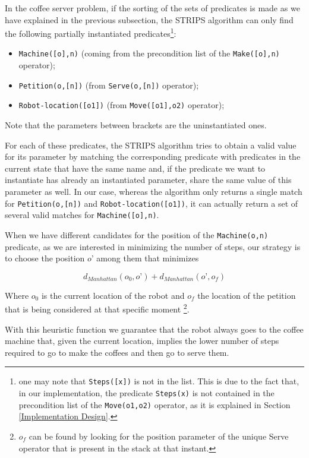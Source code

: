 \documentclass[12pt,a4paper,oneside]{article}
\numberwithin{equation}{section}
\numberwithin{equation}{section}
\theoremstyle{definition}
\begin{document}
In the coffee server problem, if the sorting of the sets of predicates is made as we have explained in the previous subsection, the STRIPS algorithm can only find the following partially instantiated predicates\footnote{one may note that \texttt{Steps([x])} is not in the list. This is due to the fact that, in our implementation, the predicate \texttt{Steps(x)} is not contained in the precondition list of the \texttt{Move(o1,o2)} operator, as it is explained in Section \ref{Implementation Design}.}:
\begin{itemize}
	\item \texttt{Machine([o],n)} (coming from the precondition list of the \texttt{Make([o],n)} operator);
	\item \texttt{Petition(o,[n])} (from \texttt{Serve(o,[n])} operator);
	\item \texttt{Robot-location([o1])} (from \texttt{Move([o1],o2)} operator);
\end{itemize}
Note that the parameters between brackets are the uninstantiated ones.


For each of these predicates, the STRIPS algorithm tries to obtain a valid value for its parameter by matching the corresponding predicate with predicates in the current state that have the same name and, if the predicate we want to instantiate has already an instantiated parameter, share the same value of this parameter as well. In our case, whereas the algorithm only returns a single match for \texttt{Petition(o,[n])} and \texttt{Robot-location([o1])}, it can actually return a set of several valid matches for \texttt{Machine([o],n)}. 


When we have different candidates for the position of the \texttt{Machine(o,n)} predicate, as we are interested in minimizing the number of steps, our strategy is to choose the position $o’$ among them that minimizes

$$d_{Manhattan} (o_0, o’) + d_{Manhattan}(o’, o_f)$$

Where $o_0$ is the current location of the robot and $o_f$ the location of the petition that is being considered at that specific moment \footnote{$o_f$ can be found by looking for the position parameter of the unique Serve operator that is present in the stack at that instant.}. 


With this heuristic function we guarantee that the robot always goes to the coffee machine that, given the current location, implies the lower number of steps required to go to make the coffees and then go to serve them.
\end{document}
